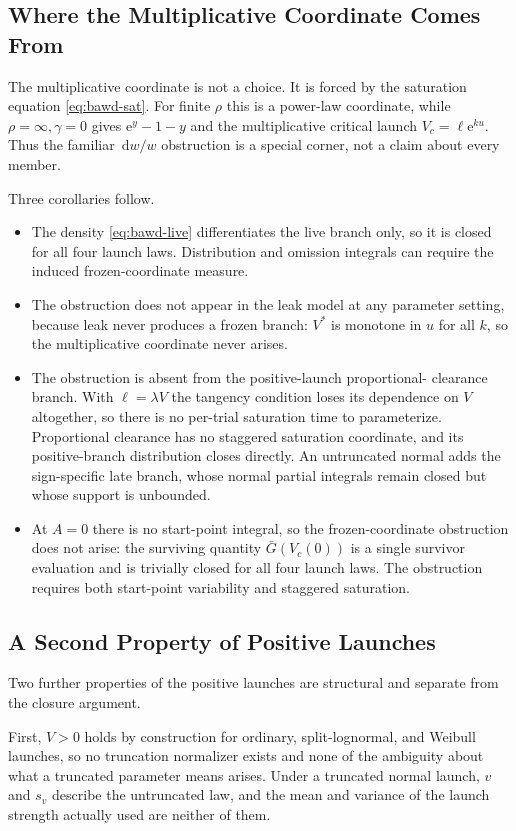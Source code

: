\documentclass[12pt]{article}
\newcommand{\dd}{\,\mathrm{d}}
\newcommand{\Gbar}{\bar{G}}
\newcommand{\e}{\mathrm{e}}
\theoremstyle{remark}
\begin{document}
\subsection{Where the Multiplicative Coordinate Comes From}
The multiplicative coordinate is not a choice. It is forced by the saturation equation \eqref{eq:bawd-sat}. For finite $\rho$ this is a power-law coordinate, while $\rho=\infty,\gamma=0$ gives $\e^y-1-y$ and the multiplicative critical launch $V_c=\ell\e^{ku}$. Thus the familiar $\dd w/w$ obstruction is a special corner, not a claim about every member.

Three corollaries follow.
\begin{itemize}
  \item The density \eqref{eq:bawd-live} differentiates the live branch only, so it is closed for all four launch laws. Distribution and omission integrals can require the induced frozen-coordinate measure.
  \item The obstruction does not appear in the leak model at any parameter setting, because leak never produces a frozen branch: $V^{*}$ is monotone in $u$ for all $k$, so the multiplicative coordinate never arises.
  \item The obstruction is absent from the positive-launch proportional- clearance branch. With $\ell=\lambda V$ the tangency condition loses its dependence on $V$ altogether, so there is no per-trial saturation time to parameterize. Proportional clearance has no staggered saturation coordinate, and its positive-branch distribution closes directly. An untruncated normal adds the sign-specific late branch, whose normal partial integrals remain closed but whose support is unbounded.
  \item At $A=0$ there is no start-point integral, so the frozen-coordinate obstruction does not arise: the surviving quantity $\Gbar(V_c(0))$ is a single survivor evaluation and is trivially closed for all four launch laws. The obstruction requires both start-point variability and staggered saturation.
\end{itemize}

\subsection{A Second Property of Positive Launches}
Two further properties of the positive launches are structural and separate from the closure argument.

First, $V > 0$ holds by construction for ordinary, split-lognormal, and Weibull launches, so no truncation normalizer exists and none of the ambiguity about what a truncated parameter means arises. Under a truncated normal launch, $v$ and $s_v$ describe the untruncated law, and the mean and variance of the launch strength actually used are neither of them.
\end{document}

